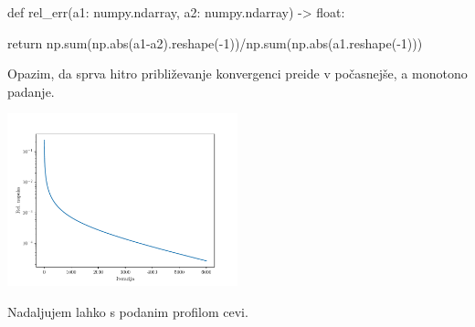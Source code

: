 \begin{python}
def rel_err(a1: numpy.ndarray, a2: numpy.ndarray) -> float:

    return np.sum(np.abs(a1-a2).reshape(-1))/np.sum(np.abs(a1.reshape(-1)))
\end{python}
Opazim, da sprva hitro približevanje konvergenci preide v počasnejše, a monotono padanje.
\begin{center}
    \includegraphics[width=0.5\textwidth]{../old/0-errors.pdf}
\end{center}
Nadaljujem lahko s podanim profilom cevi.
